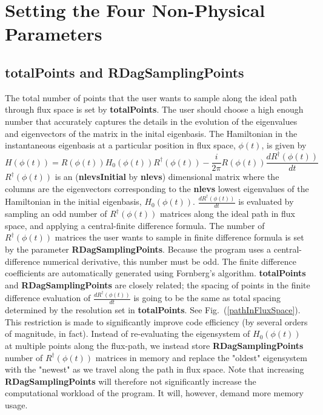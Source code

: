 \documentclass[12pt]{article}
\begin{document}
\section{Setting the Four Non-Physical Parameters}

\subsection{totalPoints and RDagSamplingPoints}
The total number of points that the user wants to sample along the ideal path through flux space is set by \textbf{totalPoints}. The user should choose a high enough number that accurately captures the details in the evolution of the eigenvalues and eigenvectors of the matrix in the inital eigenbasis.
\newline
\newline
The Hamiltonian in the instantaneous eigenbasis at a particular position in flux space, $\phi(t)$, is given by
\begin{equation}
H(\phi(t)) = R(\phi(t)) H_0(\phi(t)) R^\dagger (\phi(t))- \frac{i}{2 \pi} R(\phi(t)) \frac{d R^\dagger(\phi(t))}{dt} 
\end{equation}
$R^\dagger(\phi(t))$ is an (\textbf{nlevsInitial} by \textbf{nlevs}) dimensional matrix where the columns are the eigenvectors corresponding to the \textbf{nlevs} lowest eigenvalues of the Hamiltonian in the initial eigenbasis, $H_0(\phi(t))$. $\frac{dR^\dagger(\phi(t))}{dt}$ is evaluated by sampling an odd number of $R^\dagger(\phi(t))$ matrices along the ideal path in flux space, and applying a central-finite difference formula.
\newline
\newline
The number of $R^\dagger(\phi(t))$ matrices the user wants to sample in finite difference formula is set by the parameter \textbf{RDagSamplingPoints}. Because the program uses a central-difference numerical derivative, this number must be odd. The finite difference coefficients are automatically generated using Fornberg's algorithm\cite{Fornberg}. 
\newline
\newline
\textbf{totalPoints} and \textbf{RDagSamplingPoints} are closely related; the spacing of points in the finite difference evaluation of $\frac{dR^\dagger(\phi(t))}{dt}$ is going to be the same as total spacing determined by the resolution set in \textbf{totalPoints}. See Fig.~(\ref{pathInFluxSpace}). This restriction is made to significantly improve code efficiency (by several orders of magnitude, in fact). Instead of re-evaluating the eigensystem of $H_0(\phi(t))$ at multiple points along the flux-path, we instead store \textbf{RDagSamplingPoints} number of $R^\dagger(\phi(t))$ matrices in memory and replace the "oldest" eigensystem with the "newest" as we travel along the path in flux space. Note that increasing \textbf{RDagSamplingPoints} will therefore not significantly increase the computational workload of the program. It will, however, demand more memory usage.
\end{document}

